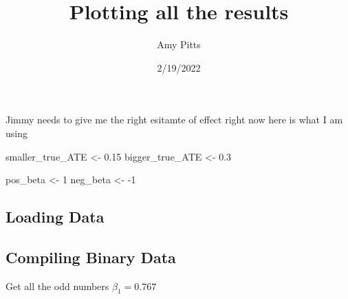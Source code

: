 \documentclass[
]{article}
\title{Plotting all the results}
\author{Amy Pitts}
\date{2/19/2022}
\newenvironment{Shaded}{\begin{snugshade}}{\end{snugshade}}
\newcommand{\DecValTok}[1]{\textcolor[rgb]{0.00,0.00,0.81}{#1}}
\newcommand{\FloatTok}[1]{\textcolor[rgb]{0.00,0.00,0.81}{#1}}
\newcommand{\NormalTok}[1]{#1}
\newcommand{\StringTok}[1]{\textcolor[rgb]{0.31,0.60,0.02}{#1}}
\begin{document}
\maketitle

Jimmy needs to give me the right esitamte of effect right now here is
what I am using

\begin{Shaded}
\begin{Highlighting}[]
\NormalTok{smaller_true_ATE <-}\StringTok{ }\FloatTok{0.15}
\NormalTok{bigger_true_ATE <-}\StringTok{ }\FloatTok{0.3}

\NormalTok{pos_beta <-}\StringTok{ }\DecValTok{1}
\NormalTok{neg_beta <-}\StringTok{ }\DecValTok{-1}
\end{Highlighting}
\end{Shaded}

\hypertarget{loading-data}{%
\subsection{Loading Data}\label{loading-data}}

\hypertarget{compiling-binary-data}{%
\subsection{Compiling Binary Data}\label{compiling-binary-data}}

Get all the odd numbers \(\beta_1 = 0.767\)
\end{document}
